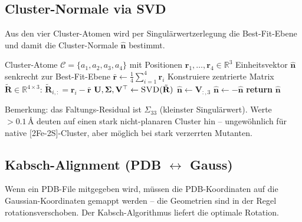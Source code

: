 \documentclass[11pt,a4paper,twoside]{article}
\providecommand{\angstrom}{\text{\AA}}    %
\theoremstyle{remark}
\begin{document}
\subsection{Cluster-Normale via SVD}
\label{app:pseudo-svd}

Aus den vier Cluster-Atomen wird per Singul\"arwertzerlegung die
Best-Fit-Ebene und damit die Cluster-Normale $\hat{\mathbf{n}}$ bestimmt.

\begin{algorithm}[H]
\caption{\textsc{ClusterNormale}}
\begin{algorithmic}[1]
\Require Cluster-Atome $\mathcal{C} = \{a_1, a_2, a_3, a_4\}$
        mit Positionen $\mathbf{r}_1, \ldots, \mathbf{r}_4 \in \mathbb{R}^3$
\Ensure Einheitsvektor $\hat{\mathbf{n}}$ senkrecht zur Best-Fit-Ebene
\State $\bar{\mathbf{r}} \gets \frac{1}{4} \sum_{i=1}^{4} \mathbf{r}_i$
\State Konstruiere zentrierte Matrix
       $\tilde{\mathbf{R}} \in \mathbb{R}^{4\times 3}$:
       $\tilde{\mathbf{R}}_{i,:} = \mathbf{r}_i - \bar{\mathbf{r}}$
\State $\mathbf{U}, \boldsymbol{\Sigma}, \mathbf{V}^\top \gets
       \textsc{SVD}(\tilde{\mathbf{R}})$
\State $\hat{\mathbf{n}} \gets \mathbf{V}_{:,3}$
  
  \State $\hat{\mathbf{n}} \gets -\hat{\mathbf{n}}$
\EndIf
\State \textbf{return} $\hat{\mathbf{n}}$
\end{algorithmic}
\end{algorithm}

Bemerkung: das Faltungs-Residual ist $\Sigma_{33}$ (kleinster Singul\"arwert).
Werte $> 0.1\,\angstrom$ deuten auf einen stark nicht-planaren Cluster hin --
ungew\"ohnlich f\"ur native [2Fe-2S]-Cluster, aber m\"oglich bei stark
verzerrten Mutanten.

\subsection{Kabsch-Alignment (PDB $\leftrightarrow$ Gauss)}
\label{app:pseudo-kabsch}

Wenn ein PDB-File mitgegeben wird, m\"ussen die PDB-Koordinaten auf
die Gaussian-Koordinaten gemappt werden -- die Geometrien sind in der
Regel rotationsverschoben. Der Kabsch-Algorithmus
\cite{Kabsch1976} liefert die optimale Rotation.
\end{document}
